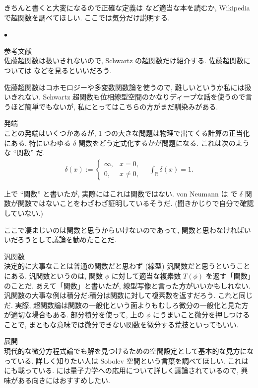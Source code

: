 \documentclass[openany, a4paper, oneside]{book}
\newcounter{enum2}
\renewenvironment{itemize}{%
\begin{list}{$\bullet$\ \ }%
{%
\usecounter{enum2}
\setlength{\itemindent}{0pt}%
\setlength{\leftmargin}{6pt}%
\setlength{\rightmargin}{0pt}%
\setlength{\labelsep}{0pt}%
\setlength{\labelwidth}{6pt}%
\setlength{\itemsep}{0pt}%
\setlength{\parsep}{0pt}%
\setlength{\listparindent}{0pt}%
}
}{%
\end{list}%
}
\theoremstyle{break}
\theoremstyle{breakdefn}
\begin{document}
きちんと書くと大変になるので正確な定義は \cite{LiebLoss1} など適当な本を読むか, Wikipedia で超関数を調べてほしい.
ここでは気分だけ説明する.
\begin{itemize}

\item 参考文献\\
\label{sec-11-3-17-3-1-1}%
佐藤超関数は扱いきれないので, Schwartz の超関数だけ紹介する.
佐藤超関数については \cite{MitsuoMorimoto1} などを見るといいだろう.

佐藤超関数はコホモロジーや多変数関数論を使うので, 難しいというか私には扱いきれない.
Schwartz 超関数も位相線型空間のかなりディープな話を使うので言うほど簡単でもないが,
私にとってはこちらの方がまだ馴染みがある.

\item 発端\\
\label{sec-11-3-17-3-1-2}%
ことの発端はいくつかあるが, 1 つの大きな問題は物理で出てくる計算の正当化にある.
特にいわゆる $\delta$ 関数をどう定式化するかが問題になる.
これは次のような ``関数'' だ.
\begin{align}
 \delta (x)
 :=
 \begin{cases}
  \infty, & x = 0, \\
  0, & x \neq 0,
 \end{cases} \quad
 \int_{\mathbb{R}} \delta (x) = 1.
\end{align}

上で ``関数'' と書いたが, 実際にはこれは関数ではない.
von Neumann は \cite{vonNeumann1} で $\delta$ 関数が関数ではないことをわざわざ証明しているそうだ.
(聞きかじりで自分で確認していない.)

ここで凄まじいのは関数と思うからいけないのであって,
関数と思わなければいいだろうとして議論を勧めたことだ.

\item 汎関数\\
\label{sec-11-3-17-3-1-3}%
決定的に大事なことは普通の関数だと思わず (線型) 汎関数だと思うということにある.
汎関数というのは, 関数 $\phi$ に対して適当な複素数 $T (\phi)$ を返す「関数」のことだ.
あえて「関数」と書いたが, 線型写像と言った方がいいかもしれない.
汎関数の大事な例は積分だ:積分は関数に対して複素数を返すだろう.
これと同じだ.
実際, 超関数論は関数の一般化という面よりもむしろ微分の一般化と見た方が適切な場合もある.
部分積分を使って, 上の $\phi$ にうまいこと微分を押しつけることで,
まともな意味では微分できない関数を微分する荒技といってもいい.

\item 展開\\
\label{sec-11-3-17-3-1-4}%
現代的な微分方程式論でも解を見つけるための空間設定として基本的な見方になっている.
詳しく知りたい人は Sobolev 空間という言葉を調べてほしい.
これは \cite{LiebLoss1} にも載っている.
\cite{LiebLoss1} には量子力学への応用について詳しく議論されているので, 興味がある向きにはおすすめしたい.
\end{itemize} %
\end{document}
